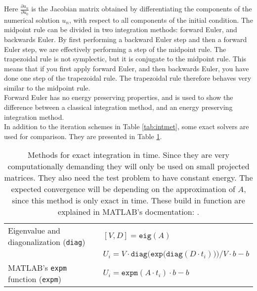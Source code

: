 Here $\frac{\partial u_n}{\partial u_0 }$ is the Jacobian matrix obtained by differentiating the components of the numerical solution $u_n$, with respect to all components of the initial condition. The midpoint rule can be divided in two integration methods: forward Euler, and backwards Euler. By first performing a backward Euler step and then a forward Euler step, we are effectively performing a step of the midpoint rule. The trapezoidal rule is not symplectic, but it is conjugate to the midpoint rule. This means that if you first apply forward Euler, and then backwards Euler, you have done one step of the trapezoidal rule. The trapezoidal rule therefore behaves very similar to the midpoint rule.\\

\noindent Forward Euler has no energy preserving properties, and is used to show the difference between a classical integration method, and an energy preserving integration method. \\

\noindent In addition to the iteration schemes in Table \ref{tab:intmet}, some exact solvers are used for comparison. They are presented in Table \ref{tab:intcorrect}.
\begin{table}

\caption{Methods for exact integration in time. Since they are very computationally demanding they will only be used on small projected matrices. They also need the test problem to have constant energy. The expected convergence will be depending on the approximation of $A$, since this method is only exact in time. These build in function are explained in MATLAB's docmentation: \cite{expm}. }

\begin{tabular}{l l}
Eigenvalue and diagonalization (\texttt{diag}) & $[V,D] = \texttt{eig}(A)$ \\
 & $U_i = V \cdot \texttt{diag} \Big( \texttt{exp} \big( \texttt{diag}(D \cdot t_i)\big)\Big)/V \cdot b - b$ \\
 \hline
MATLAB's \texttt{expm} function (\texttt{expm}) & $U_i = \texttt{expm}(A \cdot t_i) \cdot b - b$ \\

\end{tabular}

\label{tab:intcorrect} 
\end{table}

